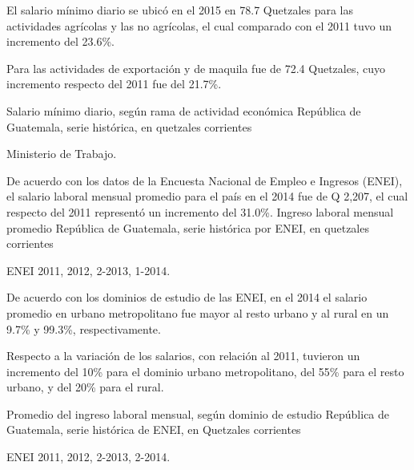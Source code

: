 
{%
El salario mínimo diario se ubicó en el 2015 en 78.7 Quetzales para las actividades agrícolas y las no agrícolas, el cual comparado con el 2011 tuvo un incremento del 23.6\%. 

Para las actividades de exportación y de maquila fue de 72.4 Quetzales, cuyo incremento respecto del 2011 fue del 21.7\%. 
}%
{%
 Salario mínimo diario, según rama de actividad económica} %
{%
 República de Guatemala, serie histórica, en quetzales corrientes} %
{%
 \begin{tikzpicture}[x=1pt,y=1pt]    \end{tikzpicture}}%
{%
 Ministerio de Trabajo.} %



%
{%
De acuerdo con los datos de la Encuesta Nacional de Empleo e Ingresos (ENEI), el salario laboral mensual promedio para el país en el 2014 fue de Q 2,207, el cual respecto del 2011 representó un incremento del 31.0\%. }%
{%
	Ingreso laboral mensual promedio} %
{%
	República de Guatemala, serie histórica por ENEI, en quetzales corrientes} %
{%
	\begin{tikzpicture}[x=1pt,y=1pt]    \end{tikzpicture}}%
{%
	ENEI 2011, 2012, 2-2013, 1-2014.} %



%
{%
De acuerdo con los dominios de estudio de las ENEI, en el 2014 el salario promedio en urbano metropolitano fue mayor al resto urbano y al rural en un 9.7\%  y 99.3\%, respectivamente.

Respecto a la variación de los salarios, con relación al 2011, tuvieron un incremento del 10\% para el dominio urbano metropolitano, del 55\% para el resto urbano, y del 20\% para el rural.}%
{%
	Promedio del ingreso laboral mensual, según dominio de estudio} %
{%
	República de Guatemala, serie histórica de ENEI, en Quetzales corrientes} %
{%
	\begin{tikzpicture}[x=1pt,y=1pt]    \end{tikzpicture}}%
{%
			ENEI 2011, 2012, 2-2013, 2-2014.} %

